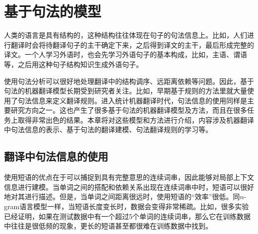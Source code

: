 
%


\renewcommand\figurename{图}%
\renewcommand\tablename{表}%


\chapter{基于句法的模型}

人类的语言是具有结构的，这种结构往往体现在句子的句法信息上。比如，人们进行翻译时会将待翻译句子的主干确定下来，之后得到译文的主干，最后形成完整的译文。一个人学习外语时，也会先学习外语句子的基本构成，比如，主语、谓语等，之后用这种句子结构知识生成外语句子。

使用句法分析可以很好地处理翻译中的结构调序、远距离依赖等问题。因此，基于句法的机器翻译模型长期受到研究者关注。比如，早期基于规则的方法里就大量使用了句法信息来定义翻译规则。进入统计机器翻译时代，句法信息的使用同样是主要研究方向之一。这也产生了很多基于句法的机器翻译模型及方法，而且在很多任务上取得非常出色的结果。本章将对这些模型和方法进行介绍，内容涉及机器翻译中句法信息的表示、基于句法的翻译建模、句法翻译规则的学习等。

\sectionnewpage
\section{翻译中句法信息的使用}

\parinterval 使用短语的优点在于可以捕捉到具有完整意思的连续词串，因此能够对局部上下文信息进行建模。当单词之间的搭配和依赖关系出现在连续词串中时，短语可以很好地对其进行描述。但是，当单词之间距离很远时，使用短语的“效率”很低。同$n$-gram语言模型一样，当短语长度变长时，数据会变得非常稀疏。比如，很多实验已经证明，如果在测试数据中有一个超过5个单词的连续词串，那么它在训练数据中往往是很低频的现象，更长的短语甚至都很难在训练数据中找到。

